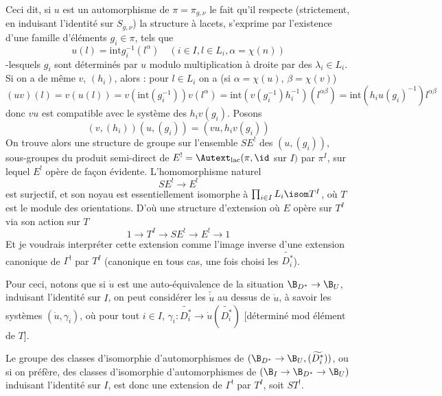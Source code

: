 Ceci dit, si $u$ est un automorphisme de $\pi = \pi_{g, \nu}$ le fait qu'il respecte (strictement, en induisant l'identité sur $S_{g, \nu}$) la structure à lacets, s'exprime par l'existence d'une famille d'éléments $g_i \in \pi$, tels que
$$
u(l) = \text{int}g^{-1}_i(l^\alpha) \quad (i \in I, l \in L_i, \alpha = \chi(n))
$$
-lesquels $g_i$ sont déterminés par $u$ modulo multiplication à droite par des $\lambda_i \in L_i$. Si on a de même $v$, $(h_i)$, alors : pour $l \in L_i$ on a (si $\alpha = \chi(u)$, $\beta = \chi(v)$)
$$
(uv)(l) = v(u(l)) = v(\text{int}(g^{-1}_i))v(l^\alpha) = \text{int}(v(g^{-1}_i) h^{-1}_i)(l^{\alpha \beta}) = \text{int}(h_i u(g_i)^{-1})l^{\alpha \beta}
$$
donc $vu$ est compatible avec le système des $h_i v(g_i)$. Posons 
$$
(v, (h_i))(u, (g_i)) = (vu, h_iv(g_i))
$$
On trouve alors une structure de groupe sur l'ensemble $S E^!$ des $(u, (g_i))$, sous-groupes du produit semi-direct de $E^! = \Autext_{\text{lac}}(\pi, \id$ sur $I)$ par $\pi^I$, sur lequel $E^!$ opère de fa\c{c}on évidente. L'homomorphisme naturel
$$
SE^! \to E^!
$$
est surjectif, et son noyau est essentiellement isomorphe à $\prod_{i \in I} L_i \isom T^I$, où $T$ est le module des orientations. D'où une structure d'extension où $E$ opère sur $T^I$ via son action sur $T$
$$
1 \to T^I \to SE^! \to E^! \to 1
$$
Et je voudrais interpréter cette extension comme l'image inverse d'une extension canonique de $\Gamma^!$ par $T^I$ (canonique en tous cas, une fois choisi les $\widetilde{D^*_i}$).

Pour ceci, notons que si $\dot{u}$ est une auto-équivalence de la situation $\B_{D^*} \to \B_U$, induisant l'identité sur $I$, on peut considérer les $\tilde{\dot{u}}$ au dessus de $\dot{u}$, à savoir les systèmes $(\dot{u}, \gamma_i)$, où pour tout $i \in I$, $\gamma_i: \widetilde{D^*_i} \to \dot{u}(\widetilde{D^*_i})$ [déterminé mod élément de $T$].

Le groupe des classes d'isomorphie d'automorphismes de $(\B_{D^*} \to \B_U, (\widetilde{D^*_i}))$, ou si on préfère, des classes d'isomorphie d'automorphismes de $(\B_I \to \B_{D^*} \to \B_U)$ induisant l'identité sur $I$, est donc une extension de $\Gamma^!$ par $T^I$, soit $ST^!$. 

